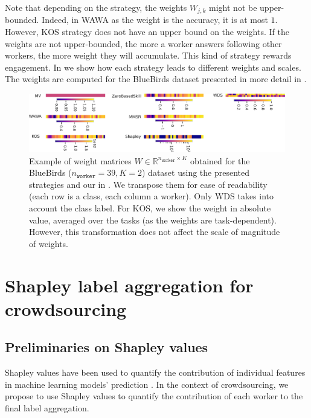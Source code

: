 \documentclass{cap2024}
\begin{document}
Note that depending on the strategy, the weights $W_{j,k}$ might not be upper-bounded. Indeed, in WAWA as the weight is the accuracy, it is at most $1$. However, KOS strategy does not have an upper bound on the weights.
If the weights are not upper-bounded, the more a worker answers following other workers, the more weight they will accumulate. This kind of strategy rewards engagement.
In  we show how each strategy leads to different weights and scales. The weights are computed for the BlueBirds dataset \citep{WelinderEtal10b} presented in more detail in .

\begin{figure}[htbp]
  \centering
  \includegraphics[width=\textwidth]{../matrix_weights_bluebirds.pdf}
  \caption{Example of weight matrices $W\in\mathbb{R}^{n_\texttt{worker}\times K}$ obtained for the BlueBirds ($n_\texttt{worker}=39, K=2$) dataset using the presented strategies and our in . We transpose them for ease of readability (each row is a class, each column a worker). Only WDS takes into account the class label. For KOS, we show the weight in absolute value, averaged over the tasks (as the weights are task-dependent). However, this transformation does not affect the scale of magnitude of weights.}
  \label{fig:weights_by_strat}
\end{figure}

\section{Shapley label aggregation for crowdsourcing}
\label{sec:shapagg}

\subsection{Preliminaries on Shapley values}

Shapley values have been used to quantify the contribution of individual features in machine learning models' prediction \citep{molnar2020interpretable}.
In the context of crowdsourcing, we propose to use Shapley values to quantify the contribution of each worker to the final label aggregation.
\end{document}
